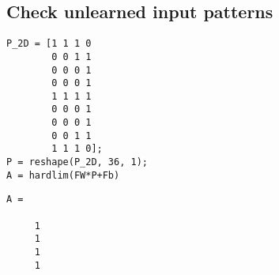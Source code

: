\documentclass[12pt]{article}
\begin{document}
\subsection*{Check unlearned input patterns}

\begin{verbatim}
P_2D = [1 1 1 0
        0 0 1 1
        0 0 0 1
        0 0 0 1
        1 1 1 1
        0 0 0 1
        0 0 0 1
        0 0 1 1
        1 1 1 0];
P = reshape(P_2D, 36, 1);
A = hardlim(FW*P+Fb)
\end{verbatim}

        \color{lightgray} \begin{verbatim}
A =

     1
     1
     1
     1

\end{verbatim} \color{black}
\end{document}
